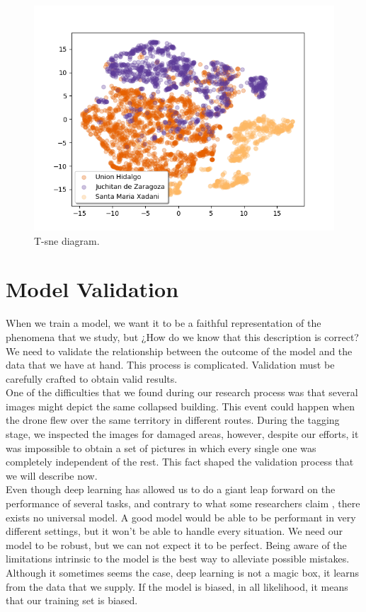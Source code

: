 \begin{figure}[h]
  \centering
  \includegraphics[width=1\textwidth]{images/t-sne.png}
  \caption{T-sne diagram.}
  \label{fig:tsne}
\end{figure}




\section{Model Validation}

When we train a model, we want it to be a faithful representation of the phenomena that we study, but ¿How do we know that this description is correct? We need to validate the relationship between the outcome of the model and the data that we have at hand. This process is complicated. Validation must be carefully crafted to obtain valid results.\\

One of the difficulties that we found during our research process was that several images might depict the same collapsed building. 
This event could happen when the drone flew over the same territory in different routes. During the tagging stage, we inspected the images for damaged areas, however, despite our efforts, it was impossible to obtain a set of pictures in which every single one was completely independent of the rest. This fact shaped the validation process that we will describe now.\\

Even though deep learning has allowed us to do a giant leap forward on the performance of several tasks, and contrary to what some researchers claim \cite{DBLP:journals/corr/KaiserGSVPJU17}, there exists no universal model. A good model would be able to be performant in very different settings, but it won't be able to handle every situation. We need our model to be robust, but we can not expect it to be perfect. Being aware of the limitations intrinsic to the model is the best way to alleviate possible mistakes. Although it sometimes seems the case, deep learning is not a magic box, it learns from the data that we supply. If the model is biased, in all likelihood, it means that our training set is biased.\\

